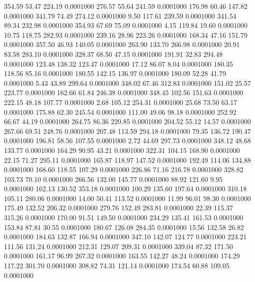  354.59   53.47  224.19   0.0001000
 276.57   55.64  241.59   0.0001000
 176.98   60.46  147.82   0.0001000
 341.79   74.49  274.12   0.0001000
   9.50  117.61  239.59   0.0001000
 341.54   89.34  232.98   0.0001000
 354.93   67.69   75.09   0.0001000
   4.15  119.84   19.60   0.0001000
  10.75  118.75  282.93   0.0001000
 239.16   28.96  223.26   0.0001000
 168.34   47.16  151.79   0.0001000
 357.50   46.93  140.05   0.0001000
 263.90  133.70  266.98   0.0001000
  20.91   83.58  283.10   0.0001000
 328.37   68.50   47.15   0.0001000
 191.91   32.83  294.48   0.0001000
 123.48  138.32  123.47   0.0001000
  17.12   86.07    8.04   0.0001000
 180.35  118.56   85.16   0.0001000
 180.55  142.15  136.97   0.0001000
 180.09   52.28   41.79   0.0001000
   5.43   43.89  299.64   0.0001000
 348.02   67.46  312.83   0.0001000
 151.02   25.57  223.77   0.0001000
 162.66   61.84  246.38   0.0001000
 348.45  102.56  151.63   0.0001000
 222.15   48.18  107.77   0.0001000
   2.68  105.12  254.31   0.0001000
  25.68   73.50   63.17   0.0001000
 175.88   62.30  245.54   0.0001000
 111.00   49.06   98.18   0.0001000
 252.92   66.67   44.19   0.0001000
 264.75   86.36  220.85   0.0001000
 204.52   55.12   14.57   0.0001000
 267.66   69.51  248.76   0.0001000
 207.48  113.59  294.18   0.0001000
  79.35  136.72  190.47   0.0001000
 196.81   58.56  107.55   0.0001000
   2.72   44.69  297.73   0.0001000
 348.12   48.68  133.77   0.0001000
 164.29   90.95   43.21   0.0001000
 322.31  104.15  168.90   0.0001000
  22.15   71.27  295.11   0.0001000
 165.87  118.97  147.52   0.0001000
 192.49  114.06  134.88   0.0001000
 168.60  118.55  107.29   0.0001000
 226.86   71.16  216.78   0.0001000
 328.82  103.73   70.10   0.0001000
 266.56  132.00  145.77   0.0001000
  88.92  121.60    9.95   0.0001000
 162.13  130.52  353.18   0.0001000
 100.29  135.60  197.64   0.0001000
 310.18  105.11  280.06   0.0001000
  14.00   50.41  113.52   0.0001000
  11.99   96.01   98.30   0.0001000
 175.49  132.52  206.32   0.0001000
 279.76  152.49  283.81   0.0001000
  22.39  115.37  315.26   0.0001000
 170.00   91.51  149.50   0.0001000
 234.29  135.41  161.53   0.0001000
 153.84   87.81   30.55   0.0001000
 180.67  126.08  284.35   0.0001000
  15.56  132.58   26.82   0.0001000
 184.63  132.87  166.94   0.0001000
 347.10  142.07  124.77   0.0001000
 223.21  111.56  131.24   0.0001000
 212.31  129.07  209.31   0.0001000
 339.04   87.32  171.50   0.0001000
 161.17   96.99  267.32   0.0001000
 163.55  142.27   48.24   0.0001000
 174.29  117.22  301.70   0.0001000
 308.82   74.31  121.14   0.0001000
 174.54   60.88  109.05   0.0001000
